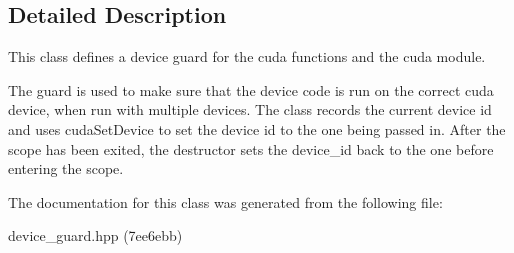 \subsection{Detailed Description}
This class defines a device guard for the cuda functions and the cuda module. 

The guard is used to make sure that the device code is run on the correct cuda device, when run with multiple devices. The class records the current device id and uses {\ttfamily cuda\+Set\+Device} to set the device id to the one being passed in. After the scope has been exited, the destructor sets the device\+\_\+id back to the one before entering the scope. 

The documentation for this class was generated from the following file\+:\begin{DoxyCompactItemize}
\item 
device\+\_\+guard.\+hpp (7ee6ebb)\end{DoxyCompactItemize}
